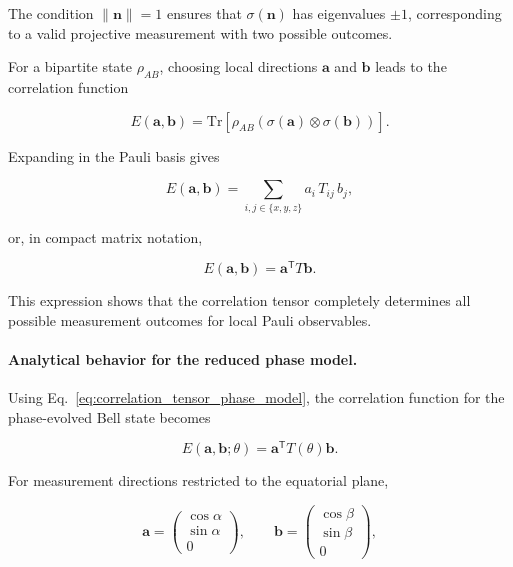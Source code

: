 The condition \( \|\mathbf{n}\| = 1 \) ensures that \( \sigma(\mathbf{n}) \) has eigenvalues \( \pm 1 \), corresponding to a valid projective measurement with two possible outcomes.

\medskip

For a bipartite state \( \rho_{AB} \), choosing local directions \( \mathbf{a} \) and \( \mathbf{b} \) leads to the correlation function

\begin{equation}
E(\mathbf{a},\mathbf{b})
=
\mathrm{Tr}
\left[
\rho_{AB}
\left(
\sigma(\mathbf{a}) \otimes \sigma(\mathbf{b})
\right)
\right].
\label{eq:axis_correlation_trace}
\end{equation}

Expanding in the Pauli basis gives

\begin{equation}
E(\mathbf{a},\mathbf{b})
=
\sum_{i,j \in \{x,y,z\}}
a_i\,T_{ij}\,b_j,
\label{eq:axis_correlation_component_form}
\end{equation}

or, in compact matrix notation,

\begin{equation}
E(\mathbf{a},\mathbf{b})
=
\mathbf{a}^{\mathsf T} T \mathbf{b}.
\label{eq:axis_correlation_tensor_form}
\end{equation}

\medskip

This expression shows that the correlation tensor completely determines all possible measurement outcomes for local Pauli observables.

\medskip

\paragraph{Analytical behavior for the reduced phase model.}

Using Eq.~\eqref{eq:correlation_tensor_phase_model}, the correlation function for the phase-evolved Bell state becomes

\begin{equation}
E(\mathbf{a},\mathbf{b};\theta)
=
\mathbf{a}^{\mathsf T} T(\theta) \mathbf{b}.
\label{eq:phase_model_axis_correlation}
\end{equation}

For measurement directions restricted to the equatorial plane,

\[
\mathbf{a}
=
\begin{pmatrix}
\cos\alpha\\
\sin\alpha\\
0
\end{pmatrix},
\qquad
\mathbf{b}
=
\begin{pmatrix}
\cos\beta\\
\sin\beta\\
0
\end{pmatrix},
\]

